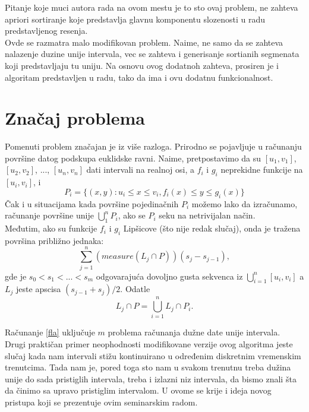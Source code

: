 \documentclass[a4paper]{article}
\begin{document}
Pitanje koje muci autora rada na ovom mestu je to sto ovaj problem, ne zahteva apriori sortiranje koje predstavlja glavnu komponentu slozenosti \cite{vesna} u radu predstavljenog resenja. \\

Ovde se razmatra malo modifikovan problem. Naime, ne samo da se zahteva nalazenje duzine unije intervala, vec se zahteva i generisanje sortianih segmenata koji predstavljaju tu uniju. Na osnovu ovog dodatnoh zahteva, prosiren je i algoritam predstavljen u radu, tako da ima i ovu dodatnu funkcionalnost. \\

\section{Značaj problema}

Pomenuti problem značajan je iz više razloga. Prirodno se pojavljuje u računanju površine datog podskupa euklidske ravni. Naime, pretpostavimo da su $[u_1, v_1]$, $[u_2, v_2]$, ..., $[u_n, v_n]$ dati intervali na realnoj osi, a $f_i$ i $g_i$ neprekidne funkcije na $[u_i, v_i]$, i \begin{equation}
    P_i = \{ (x, y): u_i\leq x \leq v_i, f_i(x) \leq y \leq g_i(x)\}
\end{equation}
Čak i u situacijama kada površine pojedinačnih $P_i$ možemo lako da izračunamo, računanje površine unije $\bigcup_1^n P_i$, ako se $P_i$ seku na netrivijalan način. \\

Međutim, ako su funkcije $f_i$ i $g_i$ Lipšicove (što nije redak slučaj), onda je tražena površina približno jednaka: \begin{equation} \label{fla}
    \sum_{j=1}^n (measure(L_j \cap P))(s_j-s_{j-1}),
\end{equation}
gde je $s_0 < s_1 < ... < s_m$ odgovarajuća dovoljno gusta sekvenca iz $\bigcup_{i=1}^n [u_i, v_i]$ a $L_j$ jeste apscisa $(s_{j-1}+s_j)/2$. Odatle \begin{equation}
    L_j \cap P = \bigcup_{i=1}^n L_j \cap P_i.
\end{equation}

Računanje \ref{fla} uključuje $m$ problema računanja dužne date unije intervala. \\

Drugi praktičan primer neophodnosti modifikovane verzije ovog algoritma jeste slučaj kada nam intervali stižu kontinuirano u određenim diskretnim vremenskim trenutcima. Tada nam je, pored toga sto nam u svakom trenutnu treba dužina unije do sada pristiglih intervala, treba i izlazni niz intervala, da bismo znali šta da činimo sa upravo pristiglim intervalom. U ovome se krije i ideja novog pristupa koji se prezentuje ovim seminarskim radom. 
\end{document}
